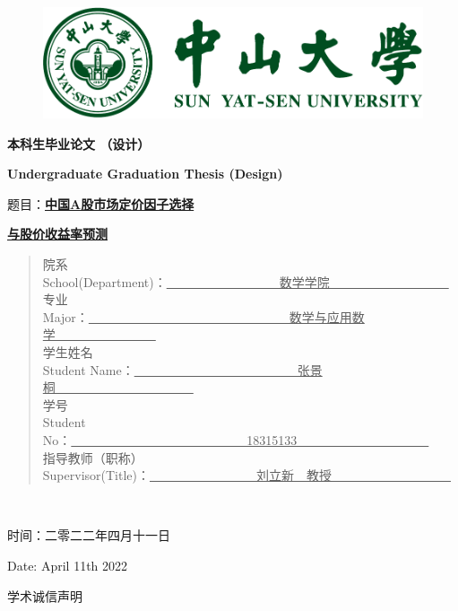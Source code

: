 \documentclass[12pt]{article} %
\begin{document}
	\thispagestyle{empty}
	\begin{figure}[ht]
		\centering
		\includegraphics[scale=0.56]{SYSULogo.pdf}
	\end{figure}
	
	\begin{center}
		\textbf{{\fontsize{35pt}{0pt}本科生毕业论文 （设计）}}
		
		\Large \textbf{{\fontsize{25pt}{0pt}Undergraduate Graduation Thesis (Design)}}
	\end{center}
	
	\begin{center}
		\huge 题目：\textbf{\underline{中国A股市场定价因子选择}}
		
		\textbf{\underline{与股价收益率预测}}
	\end{center}
	
	\begin{quotation}
		\large \noindent
		院系 \\
		School(Department)：\underline{~~~~~~~~~~~~~~~~~~数学学院~~~~~~~~~~~~~~~~~~~} \\
		专业 \\
		Major：\underline{~~~~~~~~~~~~~~~~~~~~~~~~~~~~~~~~数学与应用数学~~~~~~~~~~~~~~~~} \\
		学生姓名 \\
		Student Name：\underline{~~~~~~~~~~~~~~~~~~~~~~~~~~张景桐~~~~~~~~~~~~~~~~~~~~~~} \\
		学号 \\
		Student No：\underline{~~~~~~~~~~~~~~~~~~~~~~~~~~~~18315133~~~~~~~~~~~~~~~~~~~~~} \\
		指导教师（职称） \\
		Supervisor(Title)：\underline{~~~~~~~~~~~~~~~~~刘立新~~教授~~~~~~~~~~~~~~~~~~~}
	\end{quotation}
	~\\
	\begin{center}
		时间：二零二二年四月十一日
		
		Date: April 11th 2022
	\end{center}
	
	\newpage
	\thispagestyle{empty}
	\begin{center}
		\Large  学术诚信声明
	\end{center}
	
\end{document}
